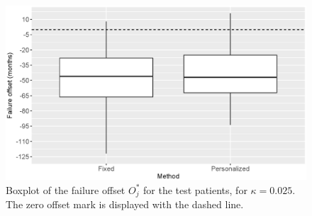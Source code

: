 \begin{figure}[!htb]
\centerline{\includegraphics[width=\columnwidth]{images/truestoptimept025.eps}}
\caption{Boxplot of the failure offset $O^*_j$ for the test patients, for $\kappa = 0.025$. The zero offset mark is displayed with the dashed line.}
\label{fig : truestoptimept025}
\end{figure}